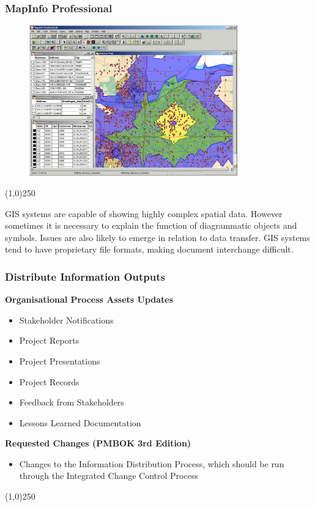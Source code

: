 \begin{frame}
\frametitle{MapInfo Professional}
\begin{figure}
	\centering
		\includegraphics[width = 9cm]{images/mapinfo.jpg}
	\label{fig:mapinfo}
\end{figure}
\end{frame}\begin{center}\line(1,0){250}\end{center}

GIS systems are capable of showing highly complex spatial data.  However sometimes it is necessary to explain the function of diagrammatic objects and symbols.  Issues are also likely to emerge in relation to data transfer.  GIS systems tend to have proprietary file formats, making document interchange difficult.



\begin{frame}
\frametitle{Distribute Information \hfill\hfill Outputs}
\textbf{Organisational Process Assets Updates}
\begin{itemize}
	\item Stakeholder Notifications
	\item Project Reports
	\item Project Presentations
	\item Project Records
	\item Feedback from Stakeholders
	\item Lessons Learned Documentation
\end{itemize}
\textbf{Requested Changes (PMBOK 3rd Edition)}
\begin{itemize}
	\item Changes to the Information Distribution Process, which should be run through the Integrated Change Control Process
\end{itemize}
\end{frame}\begin{center}\line(1,0){250}\end{center}




